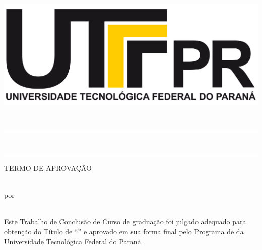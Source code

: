 {\begin{minipage}[c][2.4cm][c]{0.19\textwidth}
		\begin{center}
			\includegraphics[width=.93\textwidth]{dados/figuras/logo-instituicao.png}
		\end{center}
	\end{minipage} \\[-10pt]
	
	\rule{\textwidth}{1pt}  \\[-12pt]
	{\color{yellow} \rule{\textwidth}{1pt}}
}    
\vspace{10pt}
\begin{center}
	\ABNTEXchapterfont\large\MakeUppercase{TERMO DE APROVAÇÃO}
\end{center}
\vspace{10pt}
\begin{center}
	\ABNTEXchapterfont\large{\imprimirtitulo}\\
	\vspace{15pt}
	\ABNTEXchapterfont\large{por}\\
	\vspace{15pt}
	\ABNTEXchapterfont\large{\imprimirautor}\\
\end{center}
\vspace{40pt}
\par Este Trabalho de Conclusão de Curso de graduação foi julgado adequado para obtenção do Título de “{\imprimirtituloAcademico}” e aprovado em sua forma final pelo Programa de {\imprimirprograma} da Universidade Tecnológica Federal do Paraná. \\

